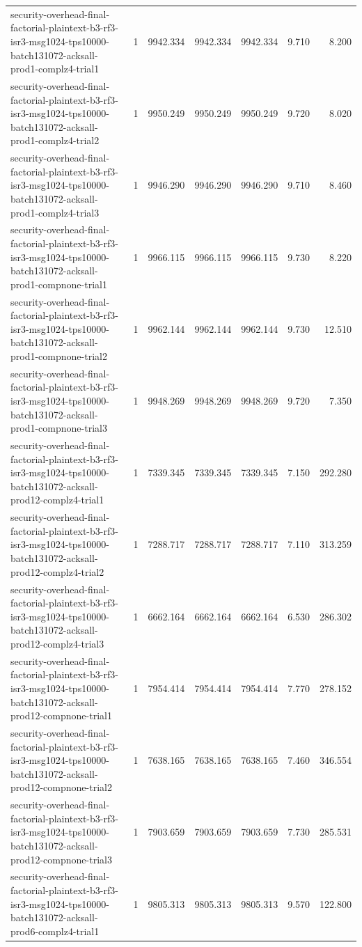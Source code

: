 \begin{tabular}{lrrrrrr}
security-overhead-final-factorial-plaintext-b3-rf3-isr3-msg1024-tps10000-batch131072-acksall-prod1-complz4-trial1 & 1 & 9942.334 & 9942.334 & 9942.334 & 9.710 & 8.200 \\
security-overhead-final-factorial-plaintext-b3-rf3-isr3-msg1024-tps10000-batch131072-acksall-prod1-complz4-trial2 & 1 & 9950.249 & 9950.249 & 9950.249 & 9.720 & 8.020 \\
security-overhead-final-factorial-plaintext-b3-rf3-isr3-msg1024-tps10000-batch131072-acksall-prod1-complz4-trial3 & 1 & 9946.290 & 9946.290 & 9946.290 & 9.710 & 8.460 \\
security-overhead-final-factorial-plaintext-b3-rf3-isr3-msg1024-tps10000-batch131072-acksall-prod1-compnone-trial1 & 1 & 9966.115 & 9966.115 & 9966.115 & 9.730 & 8.220 \\
security-overhead-final-factorial-plaintext-b3-rf3-isr3-msg1024-tps10000-batch131072-acksall-prod1-compnone-trial2 & 1 & 9962.144 & 9962.144 & 9962.144 & 9.730 & 12.510 \\
security-overhead-final-factorial-plaintext-b3-rf3-isr3-msg1024-tps10000-batch131072-acksall-prod1-compnone-trial3 & 1 & 9948.269 & 9948.269 & 9948.269 & 9.720 & 7.350 \\
security-overhead-final-factorial-plaintext-b3-rf3-isr3-msg1024-tps10000-batch131072-acksall-prod12-complz4-trial1 & 1 & 7339.345 & 7339.345 & 7339.345 & 7.150 & 292.280 \\
security-overhead-final-factorial-plaintext-b3-rf3-isr3-msg1024-tps10000-batch131072-acksall-prod12-complz4-trial2 & 1 & 7288.717 & 7288.717 & 7288.717 & 7.110 & 313.259 \\
security-overhead-final-factorial-plaintext-b3-rf3-isr3-msg1024-tps10000-batch131072-acksall-prod12-complz4-trial3 & 1 & 6662.164 & 6662.164 & 6662.164 & 6.530 & 286.302 \\
security-overhead-final-factorial-plaintext-b3-rf3-isr3-msg1024-tps10000-batch131072-acksall-prod12-compnone-trial1 & 1 & 7954.414 & 7954.414 & 7954.414 & 7.770 & 278.152 \\
security-overhead-final-factorial-plaintext-b3-rf3-isr3-msg1024-tps10000-batch131072-acksall-prod12-compnone-trial2 & 1 & 7638.165 & 7638.165 & 7638.165 & 7.460 & 346.554 \\
security-overhead-final-factorial-plaintext-b3-rf3-isr3-msg1024-tps10000-batch131072-acksall-prod12-compnone-trial3 & 1 & 7903.659 & 7903.659 & 7903.659 & 7.730 & 285.531 \\
security-overhead-final-factorial-plaintext-b3-rf3-isr3-msg1024-tps10000-batch131072-acksall-prod6-complz4-trial1 & 1 & 9805.313 & 9805.313 & 9805.313 & 9.570 & 122.800 \\

\end{tabular}
